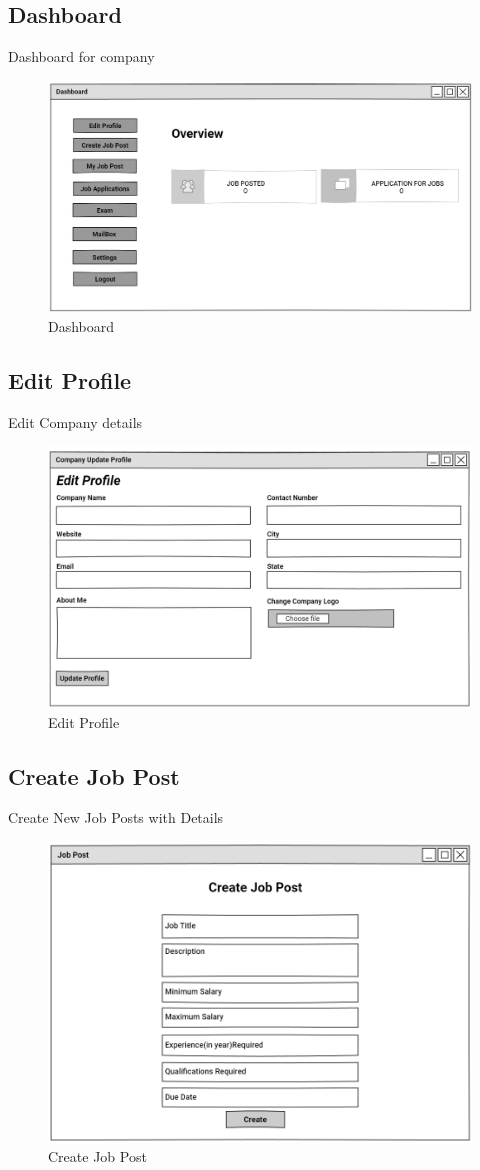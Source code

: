 \documentclass[a4paper,12pt]{report}
\begin{document}
\subsection {Dashboard}
Dashboard for company
\begin{figure}[bph]
	\centering
	\includegraphics[width=1\linewidth]{img/company/untitled_page}
	\caption{Dashboard}
\end{figure}

\pagebreak
\subsection {Edit Profile}
Edit Company details
\begin{figure}[bph]
	\centering
	\includegraphics[width=.6\linewidth]{img/company/cmpnyprflupdt}
		\caption{Edit Profile}
\end{figure}

\subsection {Create Job Post}
Create New Job Posts with Details
\begin{figure}[bph]
	\centering
	\includegraphics[width=.6\linewidth]{img/company/postjob}
	\caption{Create Job Post}
\end{figure}
\pagebreak
\end{document}
